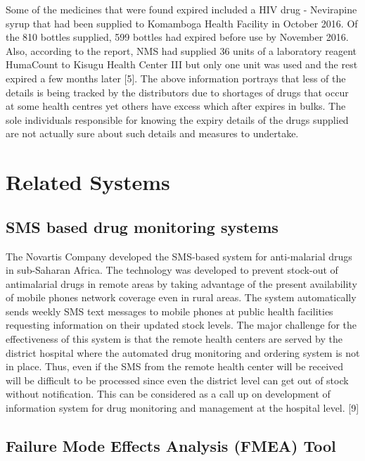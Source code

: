 \documentclass[12pt, a4paper]{report}
\begin{document}
Some of the medicines that were found expired included a HIV drug - Nevirapine syrup that had been supplied to Komamboga Health Facility in October 2016. Of the 810 bottles supplied, 599 bottles had expired before use by November 2016. Also, according to the report, NMS had supplied 36 units of a laboratory reagent HumaCount to Kisugu Health Center III but only one unit was used and the rest expired a few months later [5]. The above information portrays that less of the details is being tracked by the distributors due to shortages of drugs that occur at some health centres yet others have excess which after expires in bulks. The sole individuals responsible for knowing the expiry details of the drugs supplied are not actually sure about such details and measures to undertake. 

\section{Related Systems}
\subsection{ SMS based drug monitoring systems}
The Novartis Company developed the SMS-based system for anti-malarial drugs in sub-Saharan Africa. The technology was developed to prevent stock-out of antimalarial drugs in remote areas by taking advantage of the present availability of mobile phones network coverage even in rural areas. The system automatically sends weekly SMS text messages to mobile phones at public health facilities requesting information on their updated stock levels. The major challenge for the effectiveness of this system is that the remote health centers are served by the district hospital where the automated drug monitoring and ordering system is not in place. Thus, even if the SMS from the remote health center will be received will be difficult to be processed since even the district level can get out of stock without notification. This can be considered as a call up on development of information system for drug monitoring and management at the hospital level. [9] 



\subsection{Failure Mode Effects Analysis (FMEA) Tool}
\end{document}
